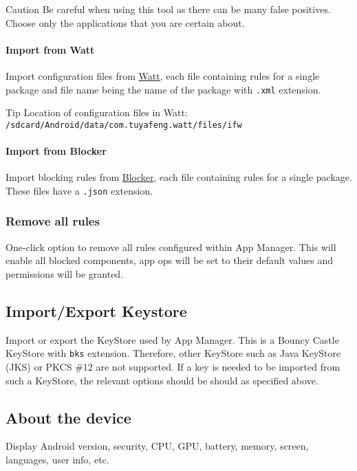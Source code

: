 \begin{danger}{Caution}
    Be careful when using this tool as there can be many false positives.
    Choose only the applications that you are certain about.
\end{danger}

\paragraph{Import from Watt} Import configuration files from \href{https://github.com/tuyafeng/Watt}{Watt}, each file
containing rules for a single package and file name being the name of the package with \texttt{.xml} extension.

\begin{tip}{Tip}
    Location of configuration files in Watt: \texttt{/sdcard/Android/data/com.tuyafeng.watt/files/ifw}
\end{tip}

\paragraph{Import from Blocker} Import blocking rules from \href{https://github.com/lihenggui/blocker}{Blocker}, each file containing rules for a single package.
These files have a \texttt{.json} extension.

\subsubsection{Remove all rules} %
One-click option to remove all rules configured within App Manager.
This will enable all blocked components, app ops will be set to their default values and permissions will be granted.

\subsection{Import/Export Keystore}\label{subsec:import/export-keystore} %
Import or export the KeyStore used by App Manager. This is a Bouncy Castle KeyStore with \texttt{bks} extension.
Therefore, other KeyStore such as Java KeyStore (JKS) or PKCS \#12 are not supported.
If a key is needed to be imported from such a KeyStore, the relevant options should be should as specified above.

\subsection{About the device}\label{subsec:device-info} %
Display Android version, security, CPU, GPU, battery, memory, screen, languages, user info, etc.
